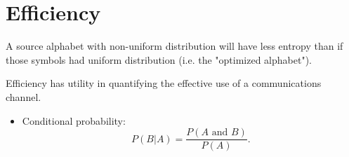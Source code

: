 \section{Efficiency}

A source alphabet with non-uniform distribution will have less entropy than if those symbols had uniform distribution (i.e. the "optimized alphabet"). 

Efficiency has utility in quantifying the effective use of a communications channel.


\begin{itemize}

\item Conditional probability:
\begin{equation*}
P(B|A)=\frac{P\left( A\text{ and }B\right) }{P\left( A\right) }.
\end{equation*}

\end{itemize}


